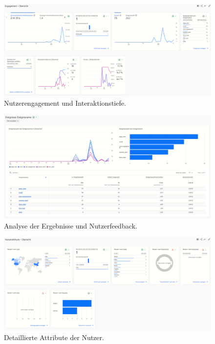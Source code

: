\begin{figure}[h]
    \centering
    \includegraphics[width=\textwidth]{Resources/SEO_engagement.png}
    \caption{Nutzerengagement und Interaktionstiefe.}
\end{figure}

\newpage

\begin{figure}[h]
    \centering
    \includegraphics[width=\textwidth]{Resources/SEO_ergebnisse.png}
    \caption{Analyse der Ergebnisse und Nutzerfeedback.}
\end{figure}

\begin{figure}[h]
    \centering
    \includegraphics[width=\textwidth]{Resources/SEO_nutzerattribute.png}
    \caption{Detaillierte Attribute der Nutzer.}
\end{figure}

